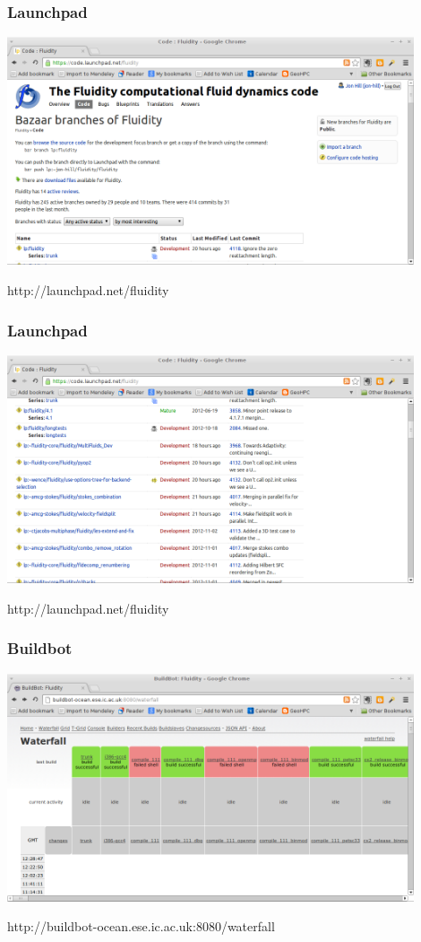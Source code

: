 \documentclass[12pt]{beamer}
\begin{document}
\begin{frame}
        \frametitle{Launchpad}
\begin{center}
    \includegraphics[width=0.9\textwidth]{images/launchpad-code.png}
\end{center}
http://launchpad.net/fluidity
\end{frame}
\begin{frame}
        \frametitle{Launchpad}
\begin{center}
    \includegraphics[width=0.9\textwidth]{images/launchpad-code2.png}
\end{center}
http://launchpad.net/fluidity
\end{frame}

\begin{frame}
\frametitle{Buildbot}
\begin{center}
\includegraphics[width=0.9\textwidth]{images/buildbot.png}
\end{center}
http://buildbot-ocean.ese.ic.ac.uk:8080/waterfall
\end{frame}
\end{document}
